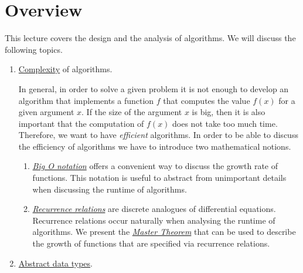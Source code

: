 \section{Overview}
This lecture covers the design and the analysis of algorithms.  We will discuss the following topics.
\begin{enumerate}

\item \href{http://en.wikipedia.org/wiki/Computational_complexity_theory}{Complexity} of algorithms.

      In general, in order to solve a given problem it is not enough to develop an algorithm that
      implements a function $f$ that computes the  value $f(x)$ for a given argument $x$.  If the size of
      the argument $x$ is big, then it is also important  
      that the computation of $f(x)$ does not take too much time.  Therefore, we want to have
      \emph{efficient} algorithms.
      In order to be able to discuss the efficiency of algorithms we have to introduce two 
      mathematical notions.
      \begin{enumerate}
      \item \href{http://en.wikipedia.org/wiki/Big_Oh}{\emph{Big O notation}} offers a convenient way to
            discuss the growth rate of functions.  This notation is useful to abstract from
            unimportant details when discussing the runtime of algorithms.  
      \item \href{http://en.wikipedia.org/wiki/Recurrence_relation}{\emph{Recurrence relations}}
            are discrete analogues of differential equations.  Recurrence relations occur naturally
            when analysing the runtime of algorithms.  We present the 
            \href{https://en.wikipedia.org/wiki/Master_theorem}{\emph{Master Theorem}} that can be
            used to describe the growth of functions that are specified via recurrence relations.
      \end{enumerate}
\item \href{http://en.wikipedia.org/wiki/Abstract_data_types}{Abstract data types}.


\end{enumerate}
